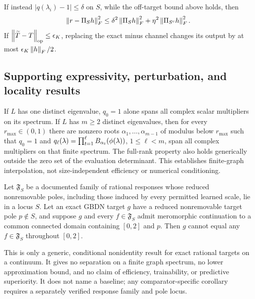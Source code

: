 \begin{corollary}
\label{cor:complex-recovery}
If instead $|q(\lambda_i)-1|\leq\delta$ on $S$, while the off-target bound
above holds, then
\begin{equation}
 \left\lVert r-\Pi_Sh\right\rVert_F^2
 \leq\delta^2\left\lVert \Pi_Sh\right\rVert_F^2
     +\eta^2\left\lVert \Pi_{S^c}h\right\rVert_F^2.
 \label{eq:complex-recovery}
\end{equation}
If $\left\lVert \widetilde T-T\right\rVert_{\mathrm{op}}\leq\epsilon_K$, replacing the exact minus
channel changes its output by at most $\epsilon_K\left\lVert h\right\rVert_F/2$.
\end{corollary}

\subsection{Supporting expressivity, perturbation, and locality results}

\begin{theorem}
\label{thm:product-sum-vandermonde}
If $L$ has one distinct eigenvalue, $q_0=1$ alone spans all complex scalar
multipliers on its spectrum.  If $L$ has $m\geq2$ distinct eigenvalues, then
for every $r_{\max}\in(0,1)$ there are nonzero roots
$\alpha_1,\ldots,\alpha_{m-1}$ of modulus below $r_{\max}$ such that
$q_0=1$ and
$q_\ell(\lambda)=\prod_{t=1}^{\ell}B_{\alpha_t}(\phi(\lambda))$,
$1\leq\ell<m$, span all complex multipliers on that finite spectrum.  The
full-rank property also holds generically outside the zero set of the
evaluation determinant.  This establishes finite-graph interpolation, not
size-independent efficiency or numerical conditioning.
\end{theorem}

\begin{theorem}
\label{thm:movable-pole-distinction}
Let $\mathfrak F_S$ be a documented family of rational responses whose reduced
nonremovable poles, including those induced by every permitted learned scale,
lie in a locus $S$.  Let an exact GBDN target $g$ have a reduced nonremovable
target pole $p\notin S$, and suppose $g$ and every
$f\in\mathfrak F_S$ admit meromorphic continuation to a common connected
domain containing $[0,2]$ and $p$.  Then $g$ cannot equal any
$f\in\mathfrak F_S$ throughout $[0,2]$.

This is only a generic, conditional nonidentity result for exact rational
targets on a continuum.  It gives no separation on a finite graph spectrum,
no lower approximation bound, and no claim of efficiency, trainability, or
predictive superiority.  It does not name a baseline; any comparator-specific
corollary requires a separately verified response family and pole locus.
\end{theorem}

